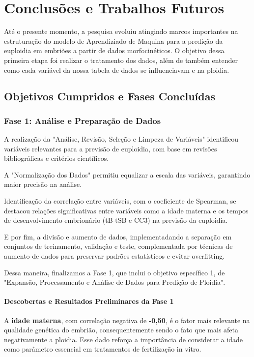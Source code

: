 \chapter[Conclusões e Trabalhos Futuros]{Conclusões e Trabalhos Futuros}

Até o presente momento, a pesquisa evoluiu atingindo marcos importantes na estruturação do modelo de Aprendiziado de Maquina para a predição da euploidia em embriões a partir de dados morfocinéticos. O objetivo dessa primeira etapa foi realizar o tratamento dos dados, além de também entender como cada variável da nossa tabela de dados se influenciavam e na ploidia. 

\section{Objetivos Cumpridos e Fases Concluídas}
\subsection{Fase 1: Análise e Preparação de Dados}
A realização da "Análise, Revisão, Seleção e Limpeza de Variáveis" identificou variáveis relevantes para a previsão de euploidia, com base em revisões bibliográficas e critérios científicos.

A "Normalização dos Dados" permitiu equalizar a escala das variáveis, garantindo maior precisão na análise.

Identificação da correlação entre variáveis, com o coeficiente de Spearman, se destacou relações significativas entre variáveis como a idade materna e os tempos de desenvolvimento embrionário (tB-tSB e CC3) na previsão da euploidia.

E por fim, a divisão e aumento de dados, implementadando a separação em conjuntos de treinamento, validação e teste, complementada por técnicas de aumento de dados para preservar padrões estatísticos e evitar overfitting.

Dessa maneira, finalizamos a Fase 1, que inclui o objetivo específico 1, de "Expansão, Processamento e Análise de Dados para Predição de Ploidia". 

\subsubsection{Descobertas e Resultados Preliminares da Fase 1}

A \textbf{idade materna}, com correlação negativa de \textbf{-0,50}, é o fator mais relevante na qualidade genética do embrião, consequentemente sendo o fato que mais afeta negativamente a ploidia. Esse dado reforça a importância de considerar a idade como parâmetro essencial em tratamentos de fertilização in vitro.

